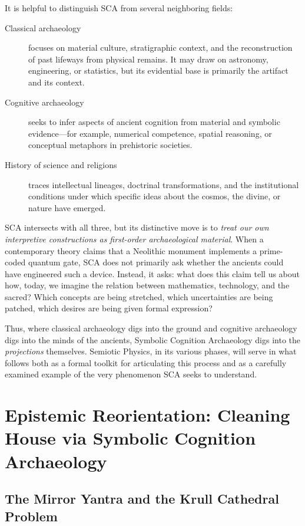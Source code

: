\documentclass[12]{amsart}
\theoremstyle{plain}
\begin{document}
It is helpful to distinguish SCA from several neighboring fields:

\begin{description}
  \item[Classical archaeology] focuses on material culture, stratigraphic context, and the reconstruction of past lifeways from physical remains. It may draw on astronomy, engineering, or statistics, but its evidential base is primarily the artifact and its context.
  \item[Cognitive archaeology] seeks to infer aspects of ancient cognition from material and symbolic evidence---for example, numerical competence, spatial reasoning, or conceptual metaphors in prehistoric societies.
  \item[History of science and religions] traces intellectual lineages, doctrinal transformations, and the institutional conditions under which specific ideas about the cosmos, the divine, or nature have emerged.
\end{description}

SCA intersects with all three, but its distinctive move is to \emph{treat our own interpretive constructions as first-order archaeological material}. When a contemporary theory claims that a Neolithic monument implements a prime-coded quantum gate, SCA does not primarily ask whether the ancients could have engineered such a device. Instead, it asks: what does this claim tell us about how, today, we imagine the relation between mathematics, technology, and the sacred? Which concepts are being stretched, which uncertainties are being patched, which desires are being given formal expression?

Thus, where classical archaeology digs into the ground and cognitive archaeology digs into the minds of the ancients, Symbolic Cognition Archaeology digs into the \emph{projections} themselves. Semiotic Physics, in its various phases, will serve in what follows both as a formal toolkit for articulating this process and as a carefully examined example of the very phenomenon SCA seeks to understand.

\section{Epistemic Reorientation: Cleaning House via Symbolic Cognition Archaeology}

\subsection{The Mirror Yantra and the Krull Cathedral Problem}
\end{document}
